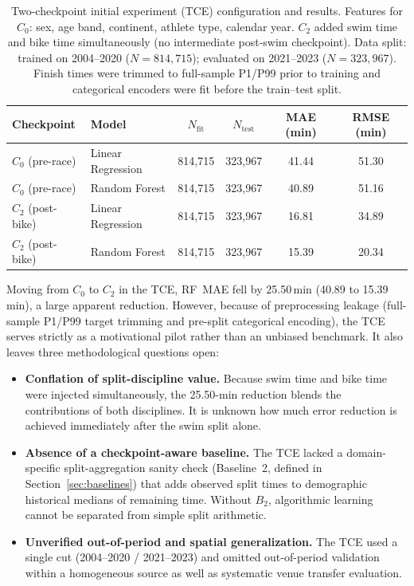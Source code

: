 \documentclass[11pt,a4paper]{article}
\begin{document}
\begin{table}[htbp]
\centering
\small
\caption{Two-checkpoint initial experiment (TCE) configuration and
results. Features for $C_0$: sex, age band, continent, athlete type,
calendar year. $C_2$ added swim time and bike time simultaneously
(no intermediate post-swim checkpoint). Data split: trained on
2004--2020 ($N = 814{,}715$); evaluated on 2021--2023
($N = 323{,}967$). Finish times were trimmed to full-sample P1/P99
prior to training and categorical encoders were fit before the
train--test split.}
\label{tab:tce}
\renewcommand{\arraystretch}{1.2}
\begin{tabularx}{\textwidth}{llcccc}
\toprule
\textbf{Checkpoint} & \textbf{Model} & $N_{\text{fit}}$ &
$N_{\text{test}}$ & \textbf{MAE (min)} & \textbf{RMSE (min)} \\
\midrule
$C_0$ (pre-race)  & Linear Regression & 814,715 & 323,967 & 41.44 & 51.30 \\
$C_0$ (pre-race)  & Random Forest     & 814,715 & 323,967 & 40.89 & 51.16 \\
$C_2$ (post-bike) & Linear Regression & 814,715 & 323,967 & 16.81 & 34.89 \\
$C_2$ (post-bike) & Random Forest     & 814,715 & 323,967 & 15.39 & 20.34 \\
\bottomrule
\end{tabularx}
\end{table}

Moving from $C_0$ to $C_2$ in the TCE, RF~MAE fell by 25.50\,min
(40.89 to 15.39\,min), a large apparent reduction. However, because
of preprocessing leakage (full-sample P1/P99 target trimming and
pre-split categorical encoding), the TCE serves strictly as a
motivational pilot rather than an unbiased benchmark. It also leaves
three methodological questions open:

\begin{itemize}[leftmargin=*]
  \item \textbf{Conflation of split-discipline value.} Because swim
  time and bike time were injected simultaneously, the 25.50-min
  reduction blends the contributions of both disciplines. It is unknown
  how much error reduction is achieved immediately after the swim
  split alone.

  \item \textbf{Absence of a checkpoint-aware baseline.}
  The TCE lacked a domain-specific split-aggregation sanity check
  (Baseline~2, defined in Section~\ref{sec:baselines}) that adds
  observed split times to demographic historical medians of remaining
  time. Without $B_2$, algorithmic learning cannot be separated from
  simple split arithmetic.

  \item \textbf{Unverified out-of-period and spatial generalization.}
  The TCE used a single cut (2004--2020 / 2021--2023) and omitted
  out-of-period validation within a homogeneous source as well as
  systematic venue transfer evaluation.
\end{itemize}
\end{document}
